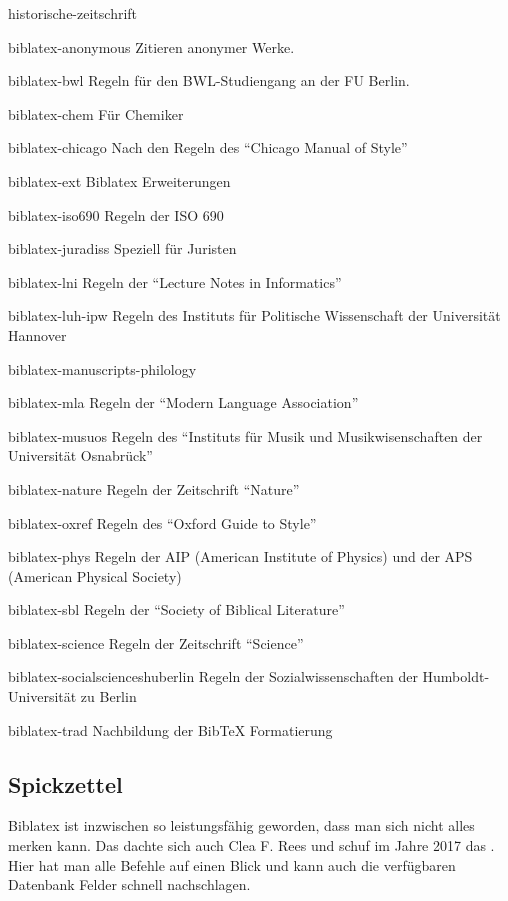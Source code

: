 \begin{labeling}{historische-zeitschrift}
\item[biblatex-anonymous] Zitieren anonymer Werke.
\item[biblatex-bwl]       Regeln für den BWL-Studiengang an der FU Berlin.
\item[biblatex-chem]      Für Chemiker
\item[biblatex-chicago]   Nach den Regeln des \enquote{Chicago Manual of
  Style}
\item[biblatex-ext]       Biblatex Erweiterungen
\item[biblatex-iso690]    Regeln der ISO 690
\item[biblatex-juradiss]  Speziell für Juristen
\item[biblatex-lni]       Regeln der \enquote{Lecture Notes in Informatics}
\item[biblatex-luh-ipw]   Regeln des Instituts für Politische Wissenschaft der Universität Hannover
\item[biblatex-manuscripts-philology]
\item[biblatex-mla]       Regeln der \enquote{Modern Language Association}
\item[biblatex-musuos]    Regeln des \enquote{Instituts für Musik und
  Musikwisenschaften der Universität Osnabrück}
\item[biblatex-nature]    Regeln der Zeitschrift \enquote{Nature}
\item[biblatex-oxref]     Regeln des \enquote{Oxford Guide to Style}
\item[biblatex-phys]      Regeln der AIP (American Institute of Physics) und der APS (American Physical Society)
\item[biblatex-sbl]       Regeln der \enquote{Society of Biblical Literature}
\item[biblatex-science]   Regeln der Zeitschrift \enquote{Science}
\item[biblatex-socialscienceshuberlin] Regeln der Sozialwissenschaften der Humboldt-Universität zu Berlin
\item[biblatex-trad]      Nachbildung der BibTeX Formatierung
\end{labeling}

\subsection{Spickzettel}

Biblatex ist inzwischen so leistungsfähig geworden, dass man sich nicht alles merken kann.
Das dachte sich auch Clea F. Rees und schuf im Jahre 2017 das .
Hier hat man alle  Befehle auf einen Blick und kann auch die verfügbaren Datenbank Felder schnell nachschlagen.

